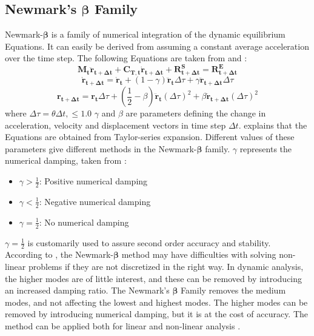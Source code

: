 \subsection{Newmark's $\boldsymbol{\beta}$ Family}
\label{sec:newmark}
Newmark-$\boldsymbol{\beta}$ is a family of numerical integration of the dynamic equilibrium Equations. It can easily be derived from assuming a constant average acceleration over the time step. The following Equations are taken from \cite{sintef2017} and \cite{Mathisen1990}: 
\begin{equation}
   \boldsymbol{M_t \ddot{r}_{t+\Delta t}} + \boldsymbol{C_{T,t}\dot{r}_{t+\Delta t}} + \boldsymbol{R_{t+\Delta t}^S}=\boldsymbol{{R_{t+\Delta t}^E}}
   \label{eq:new}
\end{equation}
\begin{equation}
    \boldsymbol{\dot{r}_{t+\Delta t}} =\boldsymbol{\dot{r}_{t}}+(1-\gamma)\boldsymbol{\ddot{r}_{t}}\Delta \tau + \gamma \boldsymbol{\ddot{r}_{t+\Delta t}} \Delta \tau
\end{equation}
\begin{equation}
    \boldsymbol{r_{t+\Delta t}} =\boldsymbol{r_{t}}\Delta \tau + (\frac{1}{2}-\beta)\boldsymbol{\ddot{r}_{t}}(\Delta \tau)^2 + \beta \boldsymbol{\ddot{r}_{t+\Delta t}} (\Delta \tau)^2
\end{equation}
where  $\Delta \tau =\theta \Delta t, \leq 1.0$\newline
\newline
$\gamma$ and $\beta$ are parameters defining the change in acceleration, velocity and displacement vectors in time step $\Delta t$. \cite{Langen1999} explains that the Equations are obtained from Taylor-series expansion.  Different values of these parameters give different methods in the Newmark-$\boldsymbol{\beta}$ family. $\gamma$ represents the numerical damping, taken from \cite{sintef2017}: 
\begin{itemize}
    \item $\gamma > \frac{1}{2}$: Positive numerical damping
    \item $\gamma < \frac{1}{2}$: Negative numerical damping
    \item $\gamma = \frac{1}{2}$: No numerical damping
\end{itemize}

\noindent $\gamma = \frac{1}{2}$ is customarily used to assure second order accuracy and stability. 
According to \cite{Mathisen1990}, the Newmark-$\boldsymbol{\beta}$ method may have difficulties with solving non-linear problems if they are not discretized in the right way. \newline
\newline
\noindent In dynamic analysis, the higher modes are of little interest, and these can be removed by introducing an increased damping ratio. The Newmark's $\boldsymbol{\beta}$ Family removes the medium modes, and not affecting the lowest and highest modes. The higher modes can be removed by introducing numerical damping, but it is at the cost of accuracy.  The method can be applied both for linear and non-linear analysis \cite{sintef2017}.

